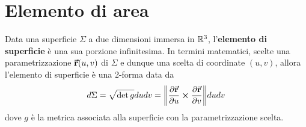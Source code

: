 \section{Elemento di area}
\begin{define}
Data una superficie	$\Sigma$ a due dimensioni immersa in $\mathbb{R}^3$, l'\textbf{elemento di superficie} è una sua porzione infinitesima. In termini matematici, scelte una parametrizzazione $\vb*{\va{r}}(u,v)$ di $\Sigma$ e dunque una scelta di coordinate $(u,v)$, allora l'elemento di superficie è una 2-forma data da
\begin{equation}
	d\Sigma=\sqrt{\det g}dudv=\norm{\pdv{\vb*{\va{r}}}{u}\cross\pdv{\vb*{\va{r}}}{v}}dudv
\end{equation}
dove $g$ è la metrica associata alla superficie con la parametrizzazione scelta.
\end{define}
\begin{comment}
\paragraph{Cambio di coordinate}
Data una parametrizzazione che mantiene l'\textit{orientazione} $\vba{r}\left(u,v\right)=\left(x(u,v),y(u,v),z(u,v)\right)$, la forma di superficie è
\begin{equation*}
	d\Sigma=\norm\pdv{\vba{r}}{u}\cross\pdv{\vba{r}}{v}dudv
\end{equation*}
Cambiando le coordinate da $(u,v)$ a $(s,t)$, la forma di superficie cambia con il determinante della Jacobiana:
\begin{equation*}
	d\Sigma=\abs{\pdv{\left(x,y,z\right)}{\left(u,v,s\right)}}dudvds
\end{equation*}
\end{comment}
